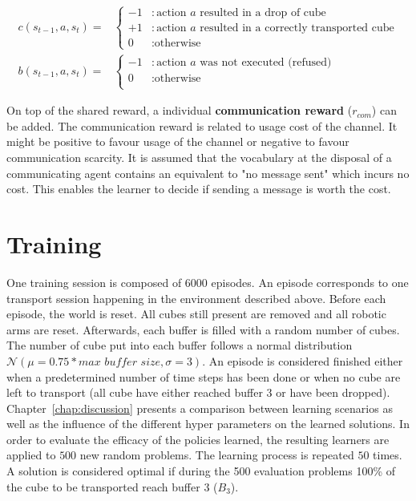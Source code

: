 \begin{equation*}
\begin{array}{rl}
    c(s_{t-1}, a, s_t) = & \left\{
     \begin{array}{rl}
       -1 & : \text{action $a$ resulted in a drop of cube}\\
       +1 & : \text{action $a$ resulted in a correctly transported cube} \\
       0 & :  \text{otherwise}
     \end{array}
    \right. \\
    b(s_{t-1}, a, s_t) = & \left\{
     \begin{array}{rl}
       -1 & : \text{action $a$ was not executed (refused)}\\
       0 & :  \text{otherwise}\\
     \end{array}
   \right.
\end{array}
\end{equation*}

On top of the shared reward, a individual \textbf{communication reward} ($r_{com}$) can be added. The communication reward is related to usage cost of the channel. It might be positive to favour usage of the channel or negative to favour communication scarcity. It is assumed that the vocabulary at the disposal of a communicating agent contains an equivalent to "no message sent" which incurs no cost. This enables the learner to decide if sending a message is worth the cost.

\section{Training}

One training session is composed of 6000 episodes. An episode corresponds to one transport session happening in the environment described above. Before each episode, the world is reset. All cubes still present are removed and all robotic arms are reset. Afterwards, each buffer is filled with a random number of cubes. The number of cube put into each buffer follows a normal distribution $\mathcal{N}(\mu=0.75*\textit{max buffer size}, \sigma=3)$. An episode is considered finished either when a predetermined number of time steps has been done or when no cube are left to transport  (all cube have either reached buffer 3 or have been dropped). Chapter~\ref{chap:discussion} presents a comparison between learning scenarios as well as the influence of the different hyper parameters on the learned solutions. In order to evaluate the efficacy of the policies learned, the resulting learners are applied to $500$ new random problems. The learning process is repeated $50$ times. A solution is considered optimal if during the 500 evaluation problems 100\% of the cube to be transported reach buffer 3 ($B_3$).

